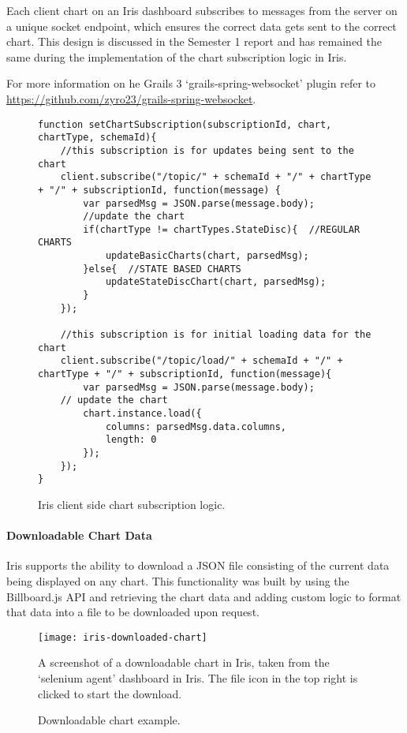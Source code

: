 \documentclass[12pt,a4paper,titlepage]{report}
\begin{document}
Each client chart on an Iris dashboard subscribes to messages from the server on a unique socket endpoint, which ensures the correct data gets sent to the correct chart. This design is discussed in the Semester 1 report and has remained the same during the implementation of the chart subscription logic in Iris.

For more information on he Grails 3 `grails-spring-websocket' plugin refer to \url{https://github.com/zyro23/grails-spring-websocket}.
\begin{figure}[H]
\begin{tcolorbox}
\begin{verbatim}
function setChartSubscription(subscriptionId, chart, chartType, schemaId){
    //this subscription is for updates being sent to the chart
    client.subscribe("/topic/" + schemaId + "/" + chartType + "/" + subscriptionId, function(message) {
        var parsedMsg = JSON.parse(message.body);
        //update the chart
        if(chartType != chartTypes.StateDisc){  //REGULAR CHARTS
            updateBasicCharts(chart, parsedMsg);
        }else{  //STATE BASED CHARTS
            updateStateDiscChart(chart, parsedMsg);
        }
    });

    //this subscription is for initial loading data for the chart
    client.subscribe("/topic/load/" + schemaId + "/" + chartType + "/" + subscriptionId, function(message){
        var parsedMsg = JSON.parse(message.body);
    // update the chart
        chart.instance.load({
            columns: parsedMsg.data.columns,
            length: 0
        });
    });
}
\end{verbatim}
\end{tcolorbox}
\caption{Iris client side chart subscription logic.}
\end{figure}

\paragraph{Downloadable Chart Data}

Iris supports the ability to download a JSON file consisting of the current data being displayed on any chart. This functionality was built by using the Billboard.js API and retrieving the chart data and adding custom logic to format that data into a file to be downloaded upon request.
\begin{figure}[H]
\begin{tcolorbox}
\begin{center}
\texttt{[image: iris-downloaded-chart]}
\end{center}
A screenshot of a downloadable chart in Iris, taken from the `selenium agent' dashboard in Iris. The file icon in the top right is clicked to start the download.
\end{tcolorbox}
\caption{Downloadable chart example.}
\label{fig:downloaded:chart}
\end{figure}
\end{document}
